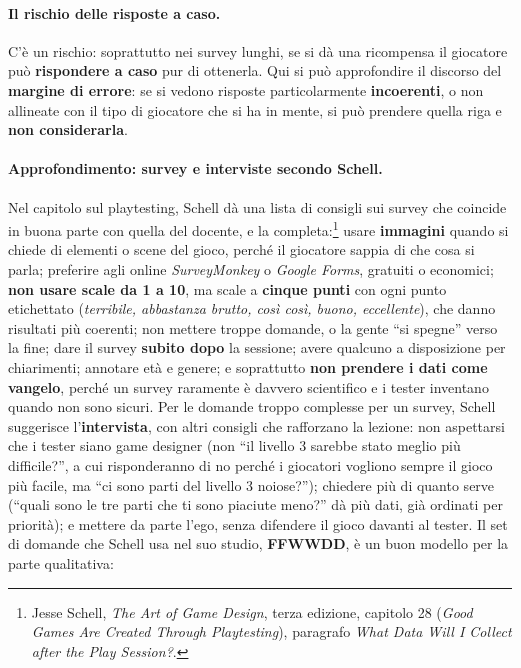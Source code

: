 \paragraph{Il rischio delle risposte a caso.} C'è un rischio: soprattutto nei
survey lunghi, se si dà una ricompensa il giocatore può \textbf{rispondere a
caso} pur di ottenerla. Qui si può approfondire il discorso del
\textbf{margine di errore}: se si vedono risposte particolarmente
\textbf{incoerenti}, o non allineate con il tipo di giocatore che si ha in
mente, si può prendere quella riga e \textbf{non considerarla}.

\paragraph{Approfondimento: survey e interviste secondo Schell.} Nel capitolo
sul playtesting, Schell dà una lista di consigli sui survey che coincide in
buona parte con quella del docente, e la completa:\footnote{Jesse Schell,
\emph{The Art of Game Design}, terza edizione, capitolo 28 (\emph{Good Games
Are Created Through Playtesting}), paragrafo \emph{What Data Will I Collect
after the Play Session?}.} usare \textbf{immagini} quando si chiede di
elementi o scene del gioco, perché il giocatore sappia di che cosa si parla;
preferire agli online \emph{SurveyMonkey} o \emph{Google Forms}, gratuiti o
economici; \textbf{non usare scale da 1 a 10}, ma scale a \textbf{cinque
punti} con ogni punto etichettato (\emph{terribile, abbastanza brutto, così
così, buono, eccellente}), che danno risultati più coerenti; non mettere
troppe domande, o la gente ``si spegne'' verso la fine; dare il survey
\textbf{subito dopo} la sessione; avere qualcuno a disposizione per
chiarimenti; annotare età e genere; e soprattutto \textbf{non prendere i dati
come vangelo}, perché un survey raramente è davvero scientifico e i tester
inventano quando non sono sicuri. Per le domande troppo complesse per un
survey, Schell suggerisce l'\textbf{intervista}, con altri consigli che
rafforzano la lezione: non aspettarsi che i tester siano game designer (non
``il livello 3 sarebbe stato meglio più difficile?'', a cui risponderanno di
no perché i giocatori vogliono sempre il gioco più facile, ma ``ci sono parti
del livello 3 noiose?''); chiedere più di quanto serve (``quali sono le tre
parti che ti sono piaciute meno?'' dà più dati, già ordinati per priorità);
e mettere da parte l'ego, senza difendere il gioco davanti al tester. Il set
di domande che Schell usa nel suo studio, \textbf{FFWWDD}, è un buon
modello per la parte qualitativa:
